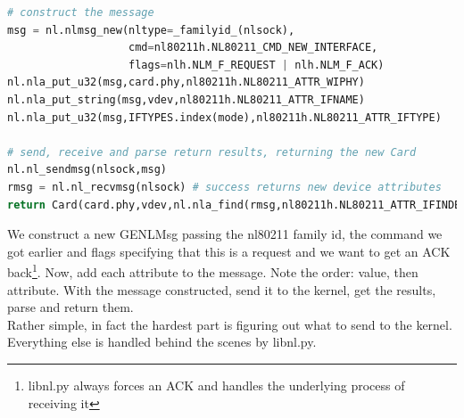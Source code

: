 \documentclass[11pt]{article}
\begin{document}
\begin{lstlisting}[caption={Coding the function},
                   label={lst:coding},
                   language=Python]
# construct the message
msg = nl.nlmsg_new(nltype=_familyid_(nlsock),
                   cmd=nl80211h.NL80211_CMD_NEW_INTERFACE,
                   flags=nlh.NLM_F_REQUEST | nlh.NLM_F_ACK)
nl.nla_put_u32(msg,card.phy,nl80211h.NL80211_ATTR_WIPHY)
nl.nla_put_string(msg,vdev,nl80211h.NL80211_ATTR_IFNAME)
nl.nla_put_u32(msg,IFTYPES.index(mode),nl80211h.NL80211_ATTR_IFTYPE)

# send, receive and parse return results, returning the new Card
nl.nl_sendmsg(nlsock,msg)
rmsg = nl.nl_recvmsg(nlsock) # success returns new device attributes
return Card(card.phy,vdev,nl.nla_find(rmsg,nl80211h.NL80211_ATTR_IFINDEX))
\end{lstlisting}

We construct a new GENLMsg passing the nl80211 family id, the command we got
earlier and flags specifying that this is a request and we want to get an ACK
back\footnote{libnl.py always forces an ACK and handles the underlying process 
of receiving it}. Now, add each attribute to the message. Note the order: value, 
then attribute. With the message constructed, send it to the kernel, get the 
results, parse and return them.\\

Rather simple, in fact the hardest part is figuring out what to send to the kernel.
Everything else is handled behind the scenes by libnl.py.
\end{document}
